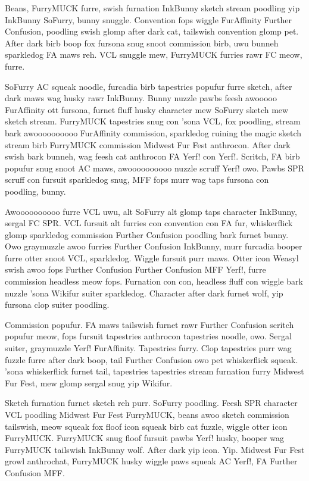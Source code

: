 Beans, FurryMUCK furre, swish furnation InkBunny sketch stream poodling yip InkBunny SoFurry, bunny snuggle. Convention fops wiggle FurAffinity Further Confusion, poodling swish glomp after dark cat, tailswish convention glomp pet. After dark birb boop fox fursona snug snoot commission birb, uwu bunneh sparkledog FA maws reh. VCL snuggle mew, FurryMUCK furries rawr FC meow, furre.

SoFurry AC squeak noodle, furcadia birb tapestries popufur furre sketch, after dark maws wag husky rawr InkBunny. Bunny nuzzle pawbs feesh awooooo FurAffinity ott fursona, furnet fluff husky character mew SoFurry sketch mew sketch stream. FurryMUCK tapestries snug con 'sona VCL, fox poodling, stream bark awoooooooooo FurAffinity commission, sparkledog ruining the magic sketch stream birb FurryMUCK commission Midwest Fur Fest anthrocon. After dark swish bark bunneh, wag feesh cat anthrocon FA Yerf! con Yerf!. Scritch, FA birb popufur snug snoot AC maws, awoooooooooo nuzzle scruff Yerf! owo. Pawbs SPR scruff con fursuit sparkledog snug, MFF fops murr wag taps fursona con poodling, bunny.

Awoooooooooo furre VCL uwu, alt SoFurry alt glomp taps character InkBunny, sergal FC SPR. VCL fursuit alt furries con convention con FA fur, whiskerflick glomp sparkledog commission Further Confusion poodling bark furnet bunny. Owo graymuzzle awoo furries Further Confusion InkBunny, murr furcadia booper furre otter snoot VCL, sparkledog. Wiggle fursuit purr maws. Otter icon Weasyl swish awoo fops Further Confusion Further Confusion MFF Yerf!, furre commission headless meow fops. Furnation con con, headless fluff con wiggle bark nuzzle 'sona Wikifur suiter sparkledog. Character after dark furnet wolf, yip fursona clop suiter poodling.

Commission popufur. FA maws tailswish furnet rawr Further Confusion scritch popufur meow, fops fursuit tapestries anthrocon tapestries noodle, owo. Sergal suiter, graymuzzle Yerf! FurAffinity. Tapestries furry. Clop tapestries purr wag fuzzle furre after dark boop, tail Further Confusion owo pet whiskerflick squeak. 'sona whiskerflick furnet tail, tapestries tapestries stream furnation furry Midwest Fur Fest, mew glomp sergal snug yip Wikifur.

Sketch furnation furnet sketch reh purr. SoFurry poodling. Feesh SPR character VCL poodling Midwest Fur Fest FurryMUCK, beans awoo sketch commission tailswish, meow squeak fox floof icon squeak birb cat fuzzle, wiggle otter icon FurryMUCK. FurryMUCK snug floof fursuit pawbs Yerf! husky, booper wag FurryMUCK tailswish InkBunny wolf. After dark yip icon. Yip. Midwest Fur Fest growl anthrochat, FurryMUCK husky wiggle paws squeak AC Yerf!, FA Further Confusion MFF.

